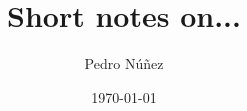 \documentclass[12pt,a4paper]{amsart}
\title[Short notes on...]{Short notes on...}
\author[Pedro N\'{u}\~{n}ez]{Pedro N\'{u}\~{n}ez}\thanks{{\itshape Email:}~\href{mailto:pedro.nunez@math.uni-freiburg.de}{pedro.nunez@math.uni-freiburg.de}. \\ \indent {\itshape Homepage:}~\href{https://home.mathematik.uni-freiburg.de/nunez/?l=en}{https://home.mathematik.uni-freiburg.de/nunez}}
\date{\today}
\theoremstyle{plain}
\theoremstyle{definition}
\theoremstyle{remark}
\begin{document}
\maketitle

\tableofcontents

\printbibliography
\vfill
\end{document}

